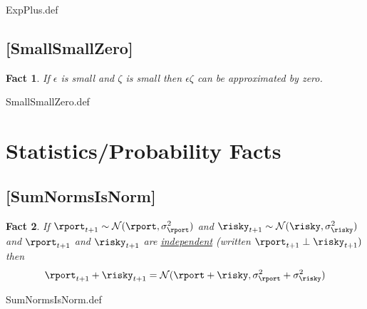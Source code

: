 \documentclass{handout}
\newtheorem{Fact}{Fact}
\begin{document}
\begin{verbatimwrite}{ExpPlus.def}
\providecommand{\ExpPlus}{\href{http://www.econ2.jhu.edu/people/ccarroll/public/LectureNotes/MathFacts/MathFactsList\#ExpPlus}{\ensuremath{\mathtt{[ExpPlus]}}}}
\end{verbatimwrite}

\hypertarget{SmallSmallZero}{}
\subsection{[SmallSmallZero]}\label{fact:SmallSmallZero}

\begin{Fact} If $\epsilon$ is small and $\zeta$ is small then $\epsilon\zeta$ can be 
approximated by zero.
\end{Fact}

\begin{verbatimwrite}{SmallSmallZero.def}
\providecommand{\SmallSmallZero}{\href{http://www.econ2.jhu.edu/people/ccarroll/public/LectureNotes/MathFacts/MathFactsList\#SmallSmallZero}{\ensuremath{\mathtt{[SmallSmallZero]}}}}
\end{verbatimwrite}



\section{Statistics/Probability Facts}

\hypertarget{SumNormsIsNorm}{}
\subsection{[SumNormsIsNorm]}


\begin{Fact} If $\rport_{t+1} \sim \mathcal{N}(\rport,\sigma^{2}_{\rport})$ and $\risky_{t+1} \sim \mathcal{N}(\risky,\sigma^{2}_{\risky})$ and $\rport_{t+1}$ and $\risky_{t+1}$ are \href{http://en.wikipedia.org/wiki/Independence_(probability_theory)}{independent} (written $\rport_{t+1} \perp \risky_{t+1})$ then
\begin{equation}
        \rport_{t+1}+\risky_{t+1} = \mathcal{N}(\rport+\risky,\sigma^{2}_{\rport}+\sigma^{2}_{\risky}) \label{eq:SumNormsIsNorm}
\end{equation}
\end{Fact}

\begin{verbatimwrite}{SumNormsIsNorm.def}
\providecommand{\SumNormsIsNorm}{\href{http://www.econ2.jhu.edu/people/ccarroll/public/LectureNotes/MathFacts/MathFactsList\#SumNormsIsNorm}{\ensuremath{\mathtt{[SumNormsIsNorm]}}}}
\end{verbatimwrite}
\end{document}
